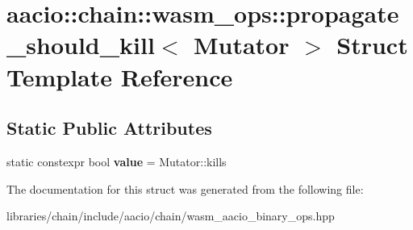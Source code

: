 \hypertarget{structaacio_1_1chain_1_1wasm__ops_1_1propagate__should__kill_3_01_mutator_01_4}{}\section{aacio\+:\+:chain\+:\+:wasm\+\_\+ops\+:\+:propagate\+\_\+should\+\_\+kill$<$ Mutator $>$ Struct Template Reference}
\label{structaacio_1_1chain_1_1wasm__ops_1_1propagate__should__kill_3_01_mutator_01_4}
\subsection*{Static Public Attributes}
\begin{DoxyCompactItemize}
\item 
\mbox{\label{structaacio_1_1chain_1_1wasm__ops_1_1propagate__should__kill_3_01_mutator_01_4_ae84fa9f8cb28fcfdb46eaf59dfb1f36b}} 
static constexpr bool {\bfseries value} = Mutator\+::kills
\end{DoxyCompactItemize}


The documentation for this struct was generated from the following file\+:\begin{DoxyCompactItemize}
\item 
libraries/chain/include/aacio/chain/wasm\+\_\+aacio\+\_\+binary\+\_\+ops.\+hpp\end{DoxyCompactItemize}
